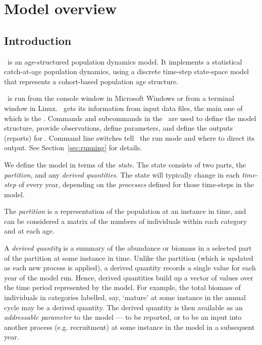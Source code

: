 \section{Model overview\label{sec:overview}}

\subsection{Introduction}

\CNAME\ is an age-structured population dynamics model. It implements a statistical catch-at-age population dynamics, using a discrete time-step state-space model that represents a cohort-based population age structure. 

\CNAME\ is run from the console window in Microsoft Windows or from a terminal window in Linux. \CNAME\ gets its information from input data files, the main one of which is the \emph{\config}. Commands and subcommands in the \config\ are used to define the model structure, provide observations, define parameters, and define the outputs (reports) for \CNAME. Command line switches tell \CNAME\ the run mode and where to direct its output. See Section~\ref{sec:running} for details.

We define the model in terms of the \emph{state}. The state consists of two parts, the \emph{partition}, and any \emph{derived quantities}. The state will typically change in each \emph{time-step} of every year, depending on the \emph{processes} defined for those time-steps in the model.

The \emph{partition} is a representation of the population at an instance in time, and can be considered a matrix of the numbers of individuals within each category and at each age.

A \emph{derived quantity} is a summary of the abundance or biomass in a selected part of the partition at some instance in time. Unlike the partition (which is updated as each new process is applied), a derived quantity records a single value for each year of the model run. Hence, derived quantities build up a vector of values over the time period represented by the model. For example, the total biomass of individuals in categories labelled, say, `mature' at some instance in the annual cycle may be a derived quantity. The derived quantity is then available as an \emph{addressable parameter} to the model --- to be reported, or to be an input into another process (e.g. recruitment) at some instance in the model in a subsequent year.

